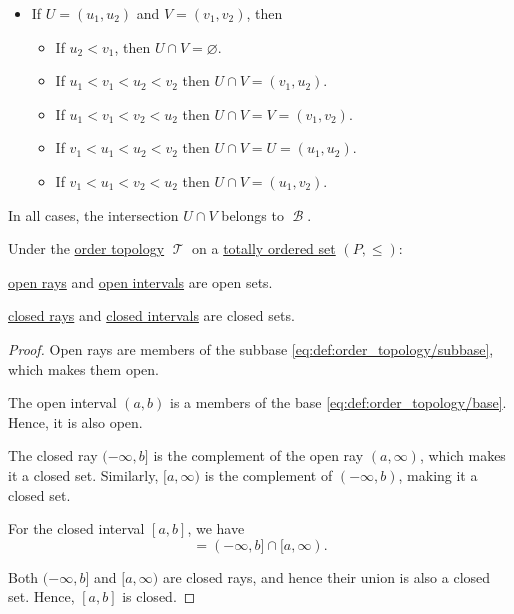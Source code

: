 \begin{defproof}
\begin{itemize}
    \item If \( U = (u_1, u_2) \) and \( V = (v_1, v_2) \), then
    \begin{itemize}
      \item If \( u_2 < v_1 \), then \( U \cap V = \varnothing \).
      \item If \( u_1 < v_1 < u_2 < v_2 \) then \( U \cap V = (v_1, u_2) \).
      \item If \( u_1 < v_1 < v_2 < u_2 \) then \( U \cap V = V = (v_1, v_2) \).
      \item If \( v_1 < u_1 < u_2 < v_2 \) then \( U \cap V = U = (u_1, u_2) \).
      \item If \( v_1 < u_1 < v_2 < u_2 \) then \( U \cap V = (u_1, v_2) \).
    \end{itemize}
  \end{itemize}

  In all cases, the intersection \( U \cap V \) belongs to \( \mscrB \).
\end{defproof}

\begin{proposition}\label{thm:order_topology_intervals}
  Under the \hyperref[def:order_topology]{order topology} \( \mscrT \) on a \hyperref[def:totally_ordered_set]{totally ordered set} \( (P, \leq) \):
  \begin{thmenum}
     \hyperref[def:partially_ordered_set_interval/ray]{open rays} and \hyperref[def:partially_ordered_set_interval/open]{open intervals} are open sets.

     \hyperref[def:partially_ordered_set_interval/ray]{closed rays} and \hyperref[def:partially_ordered_set_interval/closed]{closed intervals} are closed sets.
  \end{thmenum}
\end{proposition}
\begin{proof}
   Open rays are members of the subbase \eqref{eq:def:order_topology/subbase}, which makes them open.

  The open interval \( (a, b) \) is a members of the base \eqref{eq:def:order_topology/base}. Hence, it is also open.

   The closed ray \( (-\infty, b] \) is the complement of the open ray \( (a, \infty) \), which makes it a closed set. Similarly, \( [a, \infty) \) is the complement of \( (-\infty, b) \), making it a closed set.

  For the closed interval \( [a, b] \), we have
  \begin{equation*}
    [a, b] = (-\infty, b] \cap [a, \infty).
  \end{equation*}

  Both \( (-\infty, b] \) and \( [a, \infty) \) are closed rays, and hence their union is also a closed set. Hence, \( [a, b] \) is closed.
\end{proof}

